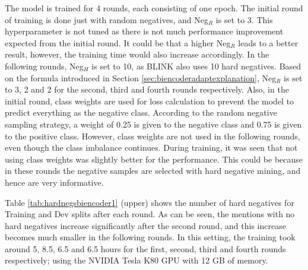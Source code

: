 \documentclass{report}
\theoremstyle{definition}
\theoremstyle{remark}
\begin{document}
The model is trained for 4 rounds, each consisting of one epoch. The initial round of training is done just with random negatives, and Neg$_R$ is set to 3. This hyperparameter is not tuned as there is not much performance improvement expected from the initial round. It could be that a higher Neg$_R$ leads to a better result, however, the training time would also increase accordingly. In the following rounds, Neg$_H$ is set to 10, as BLINK also uses 10 hard negatives. Based on the formula introduced in Section \ref{sec:biencoderadaptexplanation}, Neg$_R$ is set to 3, 2 and 2 for the second, third and fourth rounds respectively. Also, in the initial round, class weights are used for loss calculation to prevent the model to predict everything as the negative class. According to the random negative sampling strategy, a weight of 0.25 is given to the negative class and 0.75 is given to the positive class. However, class weights are not used in the following rounds, even though the class imbalance continues. During training, it was seen that not using class weights was slightly better for the performance. This could be because in these rounds the negative samples are selected with hard negative mining, and hence are very informative.

Table \ref{tab:hardnegsbiencoder1} (upper) shows the number of hard negatives for Training and Dev splits after each round. As can be seen, the mentions with no hard negatives increase significantly after the second round, and this increase becomes much smaller in the following rounds. In this setting, the training took around 5, 8.5, 6.5 and 6.5 hours for the first, second, third and fourth rounds respectively; using the NVIDIA Tesla K80 GPU with 12 GB of memory.
\end{document}

